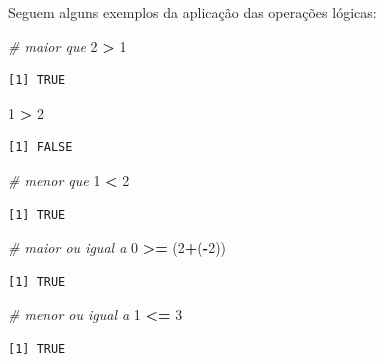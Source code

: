 \documentclass[12pt,portuguese,oneside]{book}
\newenvironment{Shaded}{\begin{snugshade}}{\end{snugshade}}
\newcommand{\DecValTok}[1]{\textcolor[rgb]{0.00,0.00,0.81}{#1}}
\newcommand{\StringTok}[1]{\textcolor[rgb]{0.31,0.60,0.02}{#1}}
\newcommand{\CommentTok}[1]{\textcolor[rgb]{0.56,0.35,0.01}{\textit{#1}}}
\newcommand{\OperatorTok}[1]{\textcolor[rgb]{0.81,0.36,0.00}{\textbf{#1}}}
\newcommand{\NormalTok}[1]{#1}
\begin{document}
Seguem alguns exemplos da aplicação das operações lógicas:

\begin{Shaded}
\begin{Highlighting}[]
\CommentTok{# maior que }
\DecValTok{2} \OperatorTok{>}\StringTok{ }\DecValTok{1}
\end{Highlighting}
\end{Shaded}

\begin{verbatim}
[1] TRUE
\end{verbatim}

\begin{Shaded}
\begin{Highlighting}[]
\DecValTok{1} \OperatorTok{>}\StringTok{ }\DecValTok{2}
\end{Highlighting}
\end{Shaded}

\begin{verbatim}
[1] FALSE
\end{verbatim}

\begin{Shaded}
\begin{Highlighting}[]
\CommentTok{# menor que }
\DecValTok{1} \OperatorTok{<}\StringTok{ }\DecValTok{2}
\end{Highlighting}
\end{Shaded}

\begin{verbatim}
[1] TRUE
\end{verbatim}

\begin{Shaded}
\begin{Highlighting}[]
\CommentTok{# maior ou igual a }
\DecValTok{0} \OperatorTok{>=}\StringTok{ }\NormalTok{(}\DecValTok{2}\OperatorTok{+}\NormalTok{(}\OperatorTok{-}\DecValTok{2}\NormalTok{))}
\end{Highlighting}
\end{Shaded}

\begin{verbatim}
[1] TRUE
\end{verbatim}

\begin{Shaded}
\begin{Highlighting}[]
\CommentTok{# menor ou igual a }
\DecValTok{1} \OperatorTok{<=}\StringTok{ }\DecValTok{3}
\end{Highlighting}
\end{Shaded}

\begin{verbatim}
[1] TRUE
\end{verbatim}
\end{document}
